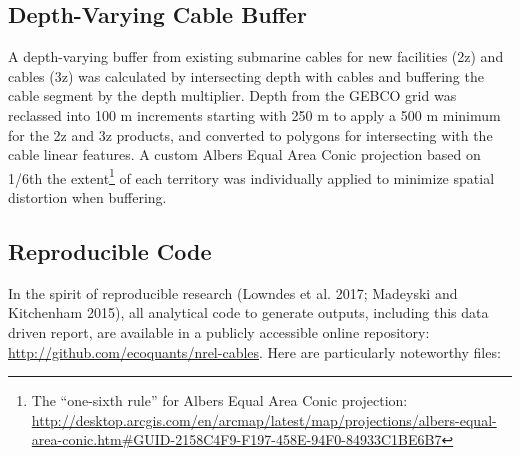 \documentclass[]{article}
\let\rmarkdownfootnote\footnote%
\def\footnote{\protect\rmarkdownfootnote}
\begin{document}
\hypertarget{depth-varying-cable-buffer}{%
\subsection{Depth-Varying Cable
Buffer}\label{depth-varying-cable-buffer}}

A depth-varying buffer from existing submarine cables for new facilities
(2z) and cables (3z) was calculated by intersecting depth with cables
and buffering the cable segment by the depth multiplier. Depth from the
GEBCO grid was reclassed into 100 m increments starting with 250 m to
apply a 500 m minimum for the 2z and 3z products, and converted to
polygons for intersecting with the cable linear features. A custom
Albers Equal Area Conic projection based on 1/6th the extent\footnote{The
  ``one-sixth rule'' for Albers Equal Area Conic projection:
  \url{http://desktop.arcgis.com/en/arcmap/latest/map/projections/albers-equal-area-conic.htm\#GUID-2158C4F9-F197-458E-94F0-84933C1BE6B7}}
of each territory was individually applied to minimize spatial
distortion when buffering.

\hypertarget{reproducible-code}{%
\subsection{Reproducible Code}\label{reproducible-code}}

In the spirit of reproducible research (Lowndes et al. 2017; Madeyski
and Kitchenham 2015), all analytical code to generate outputs, including
this data driven report, are available in a publicly accessible online
repository: \url{http://github.com/ecoquants/nrel-cables}. Here are
particularly noteworthy files:
\end{document}
